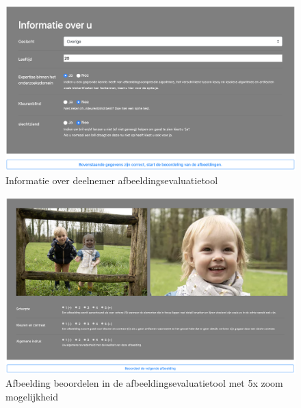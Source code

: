 \begin{figure}
	\includegraphics[width=\linewidth]{img/bijlages/afbeeldingsevaluatietool/over-u.png}
	\caption{Informatie over deelnemer  \gls{afbeeldingsevaluatietool}}
	\label{fig:bijlages-screenshot-afbeeldingsevaluatietool-over-u}
\end{figure}

\begin{figure}
	\includegraphics[width=\linewidth]{img/bijlages/afbeeldingsevaluatietool/evaluatie.png}
	\caption{Afbeelding beoordelen in de  \gls{afbeeldingsevaluatietool} met 5x zoom mogelijkheid}
	\label{fig:bijlages-screenshot-afbeeldingsevaluatietool-evalutie}
\end{figure}
